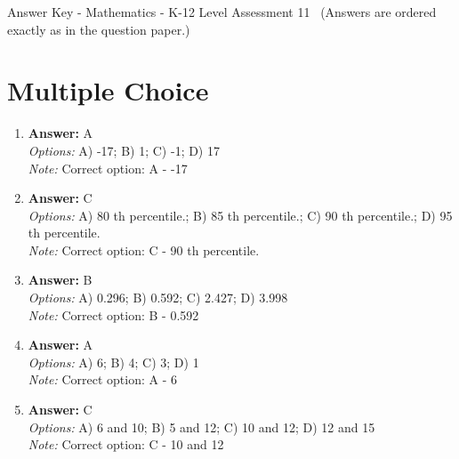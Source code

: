 \documentclass[12pt]{article}
\begin{document}
\begin{center}
Answer Key - Mathematics - K-12 Level Assessment 11 \
\small (Answers are ordered exactly as in the question paper.)
\end{center}

\section*{Multiple Choice}
\begin{enumerate}[label=\arabic*.]
\item \textbf{Answer:} A
\\ \textit{Options:} A) -17; B) 1; C) -1; D) 17
\\ \textit{Note:} Correct option: A - -17
\item \textbf{Answer:} C
\\ \textit{Options:} A) 80 th percentile.; B) 85 th percentile.; C) 90 th percentile.; D) 95 th percentile.
\\ \textit{Note:} Correct option: C - 90 th percentile.
\item \textbf{Answer:} B
\\ \textit{Options:} A) 0.296; B) 0.592; C) 2.427; D) 3.998
\\ \textit{Note:} Correct option: B - 0.592
\item \textbf{Answer:} A
\\ \textit{Options:} A) 6; B) 4; C) 3; D) 1
\\ \textit{Note:} Correct option: A - 6
\item \textbf{Answer:} C
\\ \textit{Options:} A) 6 and 10; B) 5 and 12; C) 10 and 12; D) 12 and 15
\\ \textit{Note:} Correct option: C - 10 and 12
\end{enumerate}
\end{document}
